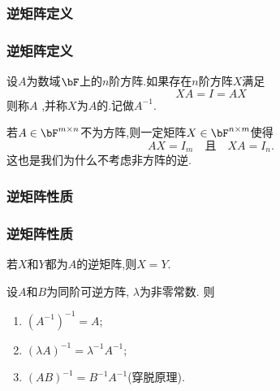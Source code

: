 \subsubsection{逆矩阵定义}
\begin{frame}\frametitle{逆矩阵定义}
\begin{definition}[逆矩阵]
设$A$为数域$\bF$上的$n$阶方阵.如果存在$n$阶方阵$X$满足
\[XA=I=AX\]
则称$A$ ,并称$X$为$A$的.记做$A^{-1}$.
\end{definition}

\bigskip
\pp


\bigskip
\pp

 若$A\in \bF^{m\times n}$不为方阵,则一定矩阵$X\in \bF^{n\times m}$使得
\[AX = I_m \quad \text{且}\quad  XA=I_n.\]
这也是我们为什么不考虑非方阵的逆.
\end{frame}





\subsubsection{逆矩阵性质}
\begin{frame}\frametitle{逆矩阵性质}
\begin{lemma}[存在则唯一]
若$X$和$Y$都为$A$的逆矩阵,则$X=Y$.
\end{lemma}
\pp
\begin{proposition}[逆矩阵的基本性质]设$A$和$B$为同阶可逆方阵, $\lambda$为非零常数. \pp 则
\begin{enumerate}
\item $(A^{-1})^{-1}=A$; \pp
\item $(\lambda A)^{-1}=\lambda^{-1}A^{-1}$; \pp
\item $(AB)^{-1}=B^{-1}A^{-1}$(穿脱原理).
\end{enumerate}
\end{proposition}
\end{frame}





